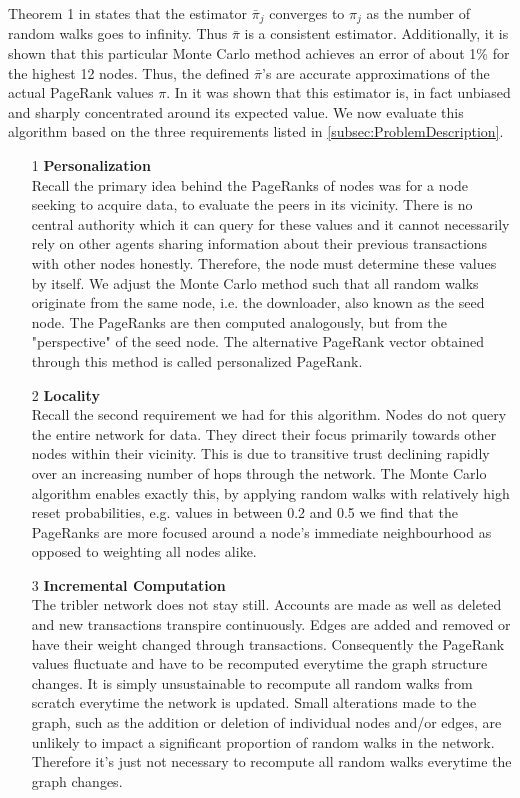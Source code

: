 \documentclass[twocolumn]{article}
\theoremstyle{definition}
\theoremstyle{theorem}
\begin{document}
\noindent Theorem 1 in \cite{Monte Carlo methods in PageRank computation: When one iteration is sufficient} states that the estimator $\bar{\pi}_j$ converges to $\pi_j$ as the number of random walks goes to infinity. Thus $\bar{\pi}$ is a consistent estimator. Additionally, it is shown that this particular Monte Carlo method achieves an error of about 1\% for the highest 12 nodes. Thus, the defined $\bar{\pi}$'s are accurate approximations of the actual PageRank values $\pi$. In \cite{Fast incremental and personalized pagerank} it was shown that this estimator is, in fact unbiased and sharply concentrated around its expected value. We now evaluate this algorithm based on the three requirements listed in \ref{subsec:ProblemDescription}.
\begin{itemize}
\item[1] {\bf Personalization} \\ Recall the primary idea behind the PageRanks of nodes was for a node seeking to acquire data, to evaluate the peers in its vicinity. There is no central authority which it can query for these values and it cannot necessarily rely on other agents sharing information about their previous transactions with other nodes honestly. Therefore, the node must determine these values by itself. We adjust the Monte Carlo method such that all random walks originate from the same node, i.e. the downloader, also known as the seed node. The PageRanks are then computed analogously, but from the "perspective" of the seed node. The alternative PageRank vector obtained through this method is called personalized PageRank.
\item[2] {\bf Locality} \\ Recall the second requirement we had for this algorithm. Nodes do not query the entire network for data. They direct their focus primarily towards other nodes within their vicinity. This is due to transitive trust declining rapidly over an increasing number of hops through the network. The Monte Carlo algorithm enables exactly this, by applying random walks with relatively high reset probabilities, e.g. values in between 0.2 and 0.5 we find that the PageRanks are more focused around a node's immediate neighbourhood as opposed to weighting all nodes alike.
\item[3] {\bf Incremental Computation}\\ The tribler network does not stay still. Accounts are made as well as deleted and new transactions transpire continuously. Edges are added and removed or have their weight changed through transactions. Consequently the PageRank values fluctuate and have to be recomputed everytime the graph structure changes. It is simply unsustainable to recompute all random walks from scratch everytime the network is updated. Small alterations made to the graph, such as the addition or deletion of individual nodes and/or edges, are unlikely to impact a significant proportion of random walks in the network. Therefore it's just not necessary to recompute all random walks everytime the graph changes. \vspace{1em}\\

\end{itemize}
\end{document}
